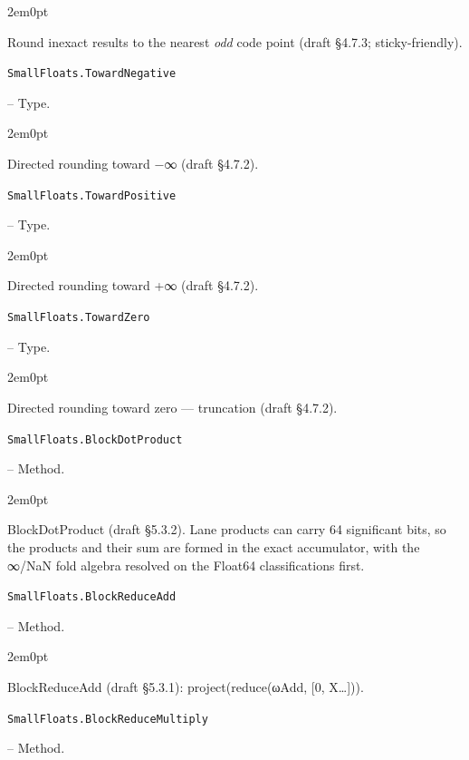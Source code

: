 \begin{adjustwidth}{2em}{0pt}

Round inexact results to the nearest \emph{odd} code point (draft §4.7.3; sticky-friendly).



\end{adjustwidth}
\hypertarget{2540988212624594754}{\texttt{SmallFloats.TowardNegative}}  -- {Type.}

\begin{adjustwidth}{2em}{0pt}

Directed rounding toward −∞ (draft §4.7.2).



\end{adjustwidth}
\hypertarget{5586350886118351895}{\texttt{SmallFloats.TowardPositive}}  -- {Type.}

\begin{adjustwidth}{2em}{0pt}

Directed rounding toward +∞ (draft §4.7.2).



\end{adjustwidth}
\hypertarget{16105017792344936885}{\texttt{SmallFloats.TowardZero}}  -- {Type.}

\begin{adjustwidth}{2em}{0pt}

Directed rounding toward zero — truncation (draft §4.7.2).



\end{adjustwidth}
\hypertarget{14266569397601053665}{\texttt{SmallFloats.BlockDotProduct}}  -- {Method.}

\begin{adjustwidth}{2em}{0pt}

BlockDotProduct (draft §5.3.2). Lane products can carry 64 significant bits, so the products and their sum are formed in the exact accumulator, with the ∞/NaN fold algebra resolved on the Float64 classifications first.



\end{adjustwidth}
\hypertarget{8157221386497919512}{\texttt{SmallFloats.BlockReduceAdd}}  -- {Method.}

\begin{adjustwidth}{2em}{0pt}

BlockReduceAdd (draft §5.3.1): project(reduce(ωAdd, [0, X…])).



\end{adjustwidth}
\hypertarget{3734371764054498420}{\texttt{SmallFloats.BlockReduceMultiply}}  -- {Method.}

